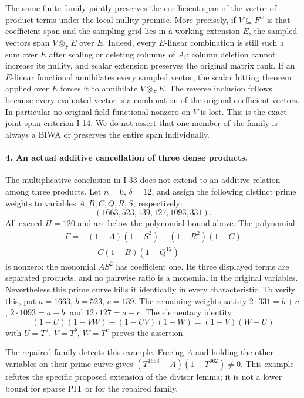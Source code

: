 The same finite family jointly preserves the coefficient
span of the vector of product terms under the local-nullity
promise. More precisely, if $V\subseteq F^w$ is that
coefficient span and the sampling grid lies in a working
extension $E$, the sampled vectors span $V\otimes_F E$
over $E$. Indeed, every $E$-linear combination is still
such a sum over $E$ after scaling or deleting columns of
$A_i$; column deletion cannot increase its nullity, and
scalar extension preserves the original matrix rank.
If an $E$-linear functional annihilates every sampled vector,
the scalar hitting theorem applied over $E$ forces it to
annihilate $V\otimes_F E$. The reverse inclusion follows
because every evaluated vector is a combination of the
original coefficient vectors. In particular no original-field
functional nonzero on $V$ is lost. This is the exact
joint-span criterion I-14. We do not assert that one member
of the family is always a BIWA or preserves the entire span
individually.

\paragraph{4. An actual additive cancellation of three dense products.}
The multiplicative conclusion in I-33 does not extend to an
additive relation among three products. Let $n=6$, $\delta=12$,
and assign the following distinct prime weights to variables
$A,B,C,Q,R,S$, respectively:
\[
 (1663,523,139,127,1093,331).
\]
All exceed $H=120$ and are below the polynomial bound above.
The polynomial
\[
 \begin{aligned}
 F={}&(1-A)(1-S^2)-(1-R^2)(1-C)\\
     &{}-C(1-B)(1-Q^{12})
 \end{aligned}
\]
is nonzero: the monomial $AS^2$ has coefficient one.
Its three displayed terms are separated products, and no
pairwise ratio is a monomial in the original variables.
Nevertheless this prime curve kills it identically in every
characteristic. To verify this, put $a=1663$, $b=523$,
$c=139$. The remaining weights satisfy
$2\cdot331=b+c$, $2\cdot1093=a+b$, and
$12\cdot127=a-c$. The elementary identity
\[
 (1-U)(1-VW)-(1-UV)(1-W)=(1-V)(W-U)
\]
with $U=T^a$, $V=T^b$, $W=T^c$ proves the assertion.

The repaired family detects this example. Freeing $A$ and
holding the other variables on their prime curve gives
$(T^{1663}-A)(1-T^{662})\ne0$. This example refutes the
specific proposed extension of the divisor lemma; it is
not a lower bound for sparse PIT or for the repaired family.

